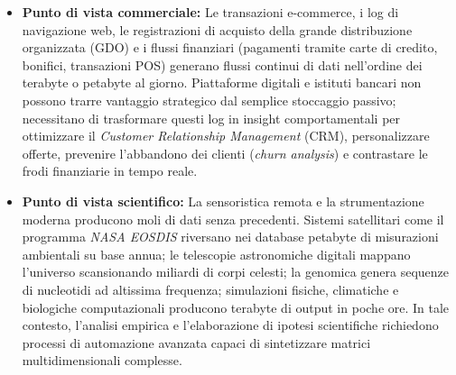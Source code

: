 \begin{itemize}
    \item \textbf{Punto di vista commerciale:} Le transazioni e-commerce, i log di navigazione web, le registrazioni di acquisto della grande distribuzione organizzata (GDO) e i flussi finanziari (pagamenti tramite carte di credito, bonifici, transazioni POS) generano flussi continui di dati nell'ordine dei terabyte o petabyte al giorno. Piattaforme digitali e istituti bancari non possono trarre vantaggio strategico dal semplice stoccaggio passivo; necessitano di trasformare questi log in insight comportamentali per ottimizzare il \textit{Customer Relationship Management} (CRM), personalizzare offerte, prevenire l'abbandono dei clienti (\textit{churn analysis}) e contrastare le frodi finanziarie in tempo reale.
    \item \textbf{Punto di vista scientifico:} La sensoristica remota e la strumentazione moderna producono moli di dati senza precedenti. Sistemi satellitari come il programma \textit{NASA EOSDIS} riversano nei database petabyte di misurazioni ambientali su base annua; le telescopie astronomiche digitali mappano l'universo scansionando miliardi di corpi celesti; la genomica genera sequenze di nucleotidi ad altissima frequenza; simulazioni fisiche, climatiche e biologiche computazionali producono terabyte di output in poche ore. In tale contesto, l'analisi empirica e l'elaborazione di ipotesi scientifiche richiedono processi di automazione avanzata capaci di sintetizzare matrici multidimensionali complesse.
\end{itemize}

